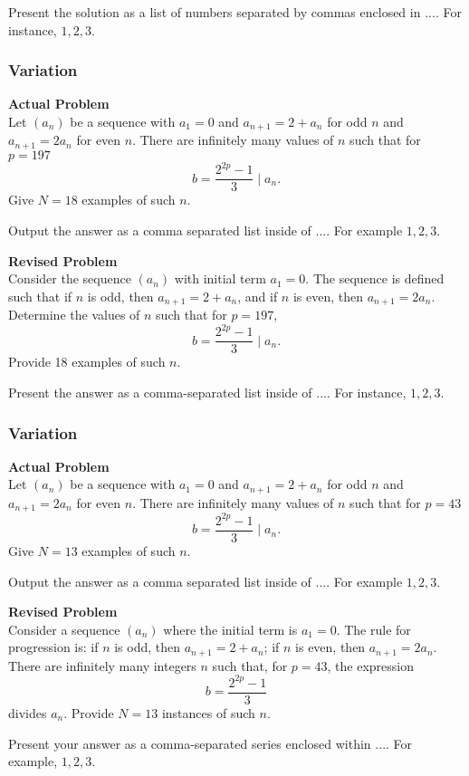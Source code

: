 Present the solution as a list of numbers separated by commas enclosed in $\boxed{...}$. For instance, $\boxed{1, 2, 3}$.

\subsubsection{Variation}
\textbf{Actual Problem}\\
Let $(a_n)$ be a sequence with $a_1=0$ and $a_{n+1}=2+a_n$ for odd $n$ and $a_{n+1}=2a_n$ for even $n$. There are infinitely many values of $n$ such that for $p=197$
$$ b=\frac{2^{2p}-1}{3} \mid a_n. $$ Give $N=18$ examples of such $n$.

Output the answer as a comma separated list inside of $\boxed{...}$. For example $\boxed{1, 2, 3}$.

\textbf{Revised Problem}\\
Consider the sequence \((a_n)\) with initial term \(a_1 = 0\). The sequence is defined such that if \(n\) is odd, then \(a_{n+1} = 2 + a_n\), and if \(n\) is even, then \(a_{n+1} = 2a_n\). Determine the values of \(n\) such that for \(p = 197\),
\[ b = \frac{2^{2p} - 1}{3} \mid a_n. \]
Provide 18 examples of such \(n\).

Present the answer as a comma-separated list inside of \(\boxed{...}\). For instance, \(\boxed{1, 2, 3}\).

\subsubsection{Variation}
\textbf{Actual Problem}\\
Let $(a_n)$ be a sequence with $a_1=0$ and $a_{n+1}=2+a_n$ for odd $n$ and $a_{n+1}=2a_n$ for even $n$. There are infinitely many values of $n$ such that for $p=43$
$$ b=\frac{2^{2p}-1}{3} \mid a_n. $$ Give $N=13$ examples of such $n$.

Output the answer as a comma separated list inside of $\boxed{...}$. For example $\boxed{1, 2, 3}$.

\textbf{Revised Problem}\\
Consider a sequence \((a_n)\) where the initial term is \( a_1 = 0 \). The rule for progression is: if \( n \) is odd, then \( a_{n+1} = 2 + a_n \); if \( n \) is even, then \( a_{n+1} = 2a_n \). There are infinitely many integers \( n \) such that, for \( p = 43\), the expression 
$$ b = \frac{2^{2p} - 1}{3} $$ divides \( a_n \). Provide \( N = 13 \) instances of such \( n \).

Present your answer as a comma-separated series enclosed within \(\boxed{...}\). For example, \(\boxed{1, 2, 3}\).

